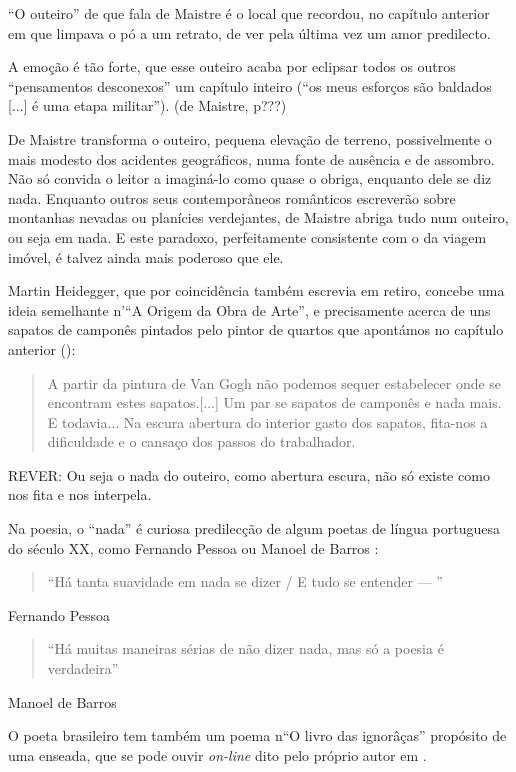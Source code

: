 \documentclass[12pt]{article}
\begin{document}
``O outeiro'' de que fala de Maistre é o local que recordou, no
capítulo anterior em que limpava o pó a um retrato, de ver pela última
vez um amor predilecto.

A emoção é tão forte, que esse outeiro acaba por eclipsar todos os
outros ``pensamentos desconexos'' um capítulo inteiro (``os meus
esforços são baldados [...] é uma etapa militar''). (de Maistre, p???)

De Maistre transforma o outeiro, pequena elevação de terreno,
possivelmente o mais modesto dos acidentes geográficos, numa fonte de
ausência e de assombro. Não só convida o leitor a imaginá-lo como
quase o obriga, enquanto dele se diz nada. Enquanto outros seus
contemporâneos românticos escreverão sobre montanhas nevadas ou
planícies verdejantes, de Maistre abriga tudo num outeiro, ou seja em
nada. E este paradoxo, perfeitamente consistente com o da viagem
imóvel, é talvez ainda mais poderoso que ele.

Martin Heidegger, que por coincidência também escrevia em retiro,
concebe uma ideia semelhante n'``A Origem da Obra de Arte'', e
precisamente acerca de uns sapatos de camponês pintados pelo pintor de
quartos que apontámos no capítulo anterior (\cite[p.24]{heidegger}):

\begin{quote}
  A partir da pintura de Van Gogh não podemos sequer estabelecer onde
  se encontram estes sapatos.[...] Um par se sapatos de camponês e
  nada mais. E todavia...  Na escura abertura do interior gasto dos
  sapatos, fita-nos a dificuldade e o cansaço dos passos do
  trabalhador.
\end{quote} 

REVER: Ou seja o nada do outeiro, como abertura escura, não só existe como
nos fita e nos interpela.

Na poesia, o ``nada'' é curiosa predilecção de algum poetas de língua
portuguesa do século XX, como Fernando Pessoa ou Manoel de Barros
\cite{manoel}:

\begin{quote}
  ``Há tanta suavidade em nada se dizer / E tudo se entender — ''
\end{quote}
Fernando Pessoa \cite{pessoa}


\begin{quote}
``Há muitas maneiras sérias de não dizer nada, mas só a poesia é verdadeira''
\end{quote}
Manoel de Barros \cite{manoelverso}

O poeta brasileiro tem também um poema n``O livro das ignorâças''
propósito de uma enseada, que se pode ouvir \emph{on-line} dito pelo
próprio autor em \cite{avidaebreve}.
\end{document}
